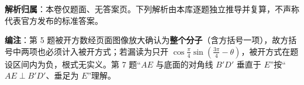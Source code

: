 

\begin{gknotice}
\textbf{解析归属}：本卷仅题面、无答案页。下列解析由本库逐题独立推导并复算，不声称代表官方发布的标准答案。

\textbf{编注}：第 5 题被开方数经页面图像放大确认为\textbf{整个分子}（含方括号一项），故方括号中两项也必须计入被开方式；若漏读为只开 $\cos\frac{\pi}{4}\sin\left(\frac{3\pi}{4}-\theta\right)$，被开方式在题设区间内为负，根式无实义。第 7 题“$AE$ 与底面的对角线 $B'D'$ 垂直于 $E$”按“$AE\perp B'D'$、垂足为 $E$”理解。
\end{gknotice}

